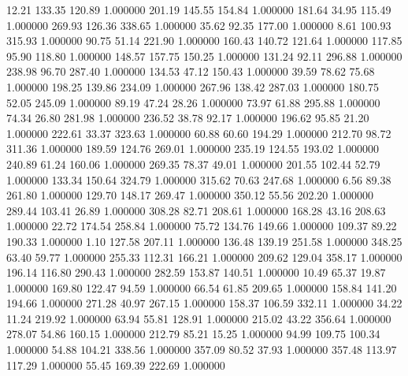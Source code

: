      12.21    133.35    120.89  1.000000
    201.19    145.55    154.84  1.000000
    181.64     34.95    115.49  1.000000
    269.93    126.36    338.65  1.000000
     35.62     92.35    177.00  1.000000
      8.61    100.93    315.93  1.000000
     90.75     51.14    221.90  1.000000
    160.43    140.72    121.64  1.000000
    117.85     95.90    118.80  1.000000
    148.57    157.75    150.25  1.000000
    131.24     92.11    296.88  1.000000
    238.98     96.70    287.40  1.000000
    134.53     47.12    150.43  1.000000
     39.59     78.62     75.68  1.000000
    198.25    139.86    234.09  1.000000
    267.96    138.42    287.03  1.000000
    180.75     52.05    245.09  1.000000
     89.19     47.24     28.26  1.000000
     73.97     61.88    295.88  1.000000
     74.34     26.80    281.98  1.000000
    236.52     38.78     92.17  1.000000
    196.62     95.85     21.20  1.000000
    222.61     33.37    323.63  1.000000
     60.88     60.60    194.29  1.000000
    212.70     98.72    311.36  1.000000
    189.59    124.76    269.01  1.000000
    235.19    124.55    193.02  1.000000
    240.89     61.24    160.06  1.000000
    269.35     78.37     49.01  1.000000
    201.55    102.44     52.79  1.000000
    133.34    150.64    324.79  1.000000
    315.62     70.63    247.68  1.000000
      6.56     89.38    261.80  1.000000
    129.70    148.17    269.47  1.000000
    350.12     55.56    202.20  1.000000
    289.44    103.41     26.89  1.000000
    308.28     82.71    208.61  1.000000
    168.28     43.16    208.63  1.000000
     22.72    174.54    258.84  1.000000
     75.72    134.76    149.66  1.000000
    109.37     89.22    190.33  1.000000
      1.10    127.58    207.11  1.000000
    136.48    139.19    251.58  1.000000
    348.25     63.40     59.77  1.000000
    255.33    112.31    166.21  1.000000
    209.62    129.04    358.17  1.000000
    196.14    116.80    290.43  1.000000
    282.59    153.87    140.51  1.000000
     10.49     65.37     19.87  1.000000
    169.80    122.47     94.59  1.000000
     66.54     61.85    209.65  1.000000
    158.84    141.20    194.66  1.000000
    271.28     40.97    267.15  1.000000
    158.37    106.59    332.11  1.000000
     34.22     11.24    219.92  1.000000
     63.94     55.81    128.91  1.000000
    215.02     43.22    356.64  1.000000
    278.07     54.86    160.15  1.000000
    212.79     85.21     15.25  1.000000
     94.99    109.75    100.34  1.000000
     54.88    104.21    338.56  1.000000
    357.09     80.52     37.93  1.000000
    357.48    113.97    117.29  1.000000
     55.45    169.39    222.69  1.000000
